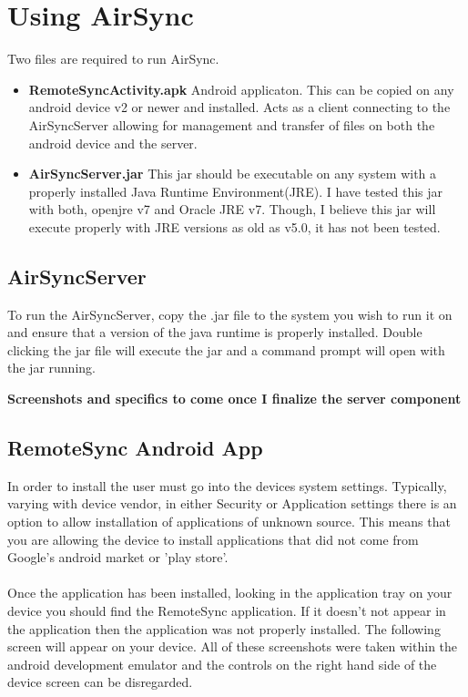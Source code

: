 \documentclass[12pt]{article}
\begin{document}
\section{Using AirSync}

Two files are required to run AirSync. 
\begin{itemize}
\item \textbf{RemoteSyncActivity.apk} Android applicaton. This can be copied on any android device v2 or newer and installed. Acts as a client connecting to the AirSyncServer allowing for management and transfer of files on both the android device and the server.
\item \textbf{AirSyncServer.jar} This jar should be executable on any system with a properly installed Java Runtime Environment(JRE). I have tested this jar with both, openjre v7 and Oracle JRE v7. Though, I believe this jar will execute properly with JRE versions as old as v5.0, it has not been tested.
\end{itemize}

\subsection{AirSyncServer}

To run the AirSyncServer, copy the .jar file to the system you wish to run it on and ensure that a version of the java runtime is properly installed. Double clicking the jar file will execute the jar and a command prompt will open with the jar running. 

\textbf{Screenshots and specifics to come once I finalize the server component}

\subsection{RemoteSync Android App}
In order to install the user must go into the devices system settings. Typically, varying with device vendor, in either Security or Application settings there is an option to allow installation of applications of unknown source. This means that you are allowing the device to install applications that did not come from Google's android market or 'play store'.\\\\
Once the application has been installed, looking in the application tray on your device you should find the RemoteSync application. If it doesn't not appear in the application then the application was not properly installed. The following screen will appear on your device. All of these screenshots were taken within the android development emulator and the controls on the right hand side of the device screen can be disregarded.\\
\end{document}
